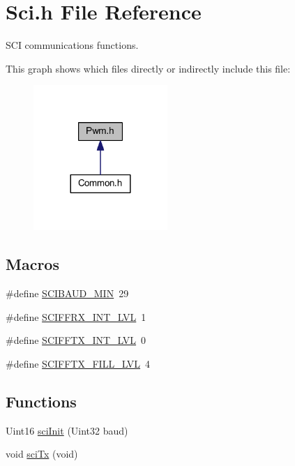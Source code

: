 \hypertarget{a00027}{\section{Sci.\-h File Reference}
\label{a00027}
}


S\-C\-I communications functions.  


This graph shows which files directly or indirectly include this file\-:
\nopagebreak
\begin{figure}[H]
\begin{center}
\leavevmode
\includegraphics[width=144pt]{a00052}
\end{center}
\end{figure}
\subsection*{Macros}
\begin{DoxyCompactItemize}
\item 
\#define \hyperlink{a00027_a0e4c420431b12616b61e9f3a28f07e4d}{S\-C\-I\-B\-A\-U\-D\-\_\-\-M\-I\-N}~29
\item 
\#define \hyperlink{a00027_a5733933fffc18dbcb8bc9404e80bc493}{S\-C\-I\-F\-F\-R\-X\-\_\-\-I\-N\-T\-\_\-\-L\-V\-L}~1
\item 
\#define \hyperlink{a00027_a5340c9de55b8e5c65ef801d2dcabffd7}{S\-C\-I\-F\-F\-T\-X\-\_\-\-I\-N\-T\-\_\-\-L\-V\-L}~0
\item 
\#define \hyperlink{a00027_af0368b1c16e194a32bf4ce09eb937930}{S\-C\-I\-F\-F\-T\-X\-\_\-\-F\-I\-L\-L\-\_\-\-L\-V\-L}~4
\end{DoxyCompactItemize}
\subsection*{Functions}
\begin{DoxyCompactItemize}
\item 
Uint16 \hyperlink{a00027_a1f05b9c5226c73b67c1d6c3bf7f80b52}{sci\-Init} (Uint32 baud)
\item 
void \hyperlink{a00027_a941bdbf3e64ac5f4492a7f7c5936b445}{sci\-Tx} (void)
\end{DoxyCompactItemize}


